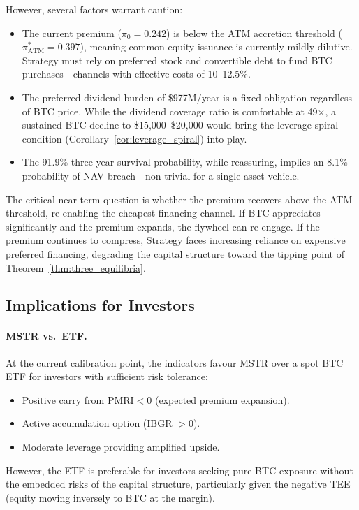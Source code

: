 However, several factors warrant caution:
\begin{itemize}
  \item The current premium ($\pi_0 = 0.242$) is below the ATM accretion
    threshold ($\pi^*_{\mathrm{ATM}} = 0.397$), meaning common equity
    issuance is currently mildly dilutive.  Strategy must rely on
    preferred stock and convertible debt to fund BTC purchases---channels
    with effective costs of 10--12.5\%.
  \item The preferred dividend burden of \$977M/year is a fixed obligation
    regardless of BTC price.  While the dividend coverage ratio is
    comfortable at 49$\times$, a sustained BTC decline to \$15,000--\$20,000
    would bring the leverage spiral condition
    (Corollary~\ref{cor:leverage_spiral}) into play.
  \item The 91.9\% three-year survival probability, while reassuring,
    implies an 8.1\% probability of NAV breach---non-trivial for a
    single-asset vehicle.
\end{itemize}

The critical near-term question is whether the premium recovers above the
ATM threshold, re-enabling the cheapest financing channel.  If BTC
appreciates significantly and the premium expands, the flywheel can
re-engage.  If the premium continues to compress, Strategy faces increasing
reliance on expensive preferred financing, degrading the capital structure
toward the tipping point of Theorem~\ref{thm:three_equilibria}.

\subsection{Implications for Investors}

\paragraph{MSTR vs.\ ETF.}
At the current calibration point, the indicators favour MSTR over a spot
BTC ETF for investors with sufficient risk tolerance:
\begin{itemize}
  \item Positive carry from $\mathrm{PMRI} < 0$ (expected premium
    expansion).
  \item Active accumulation option (IBGR $> 0$).
  \item Moderate leverage providing amplified upside.
\end{itemize}
However, the ETF is preferable for investors seeking pure BTC exposure
without the embedded risks of the capital structure, particularly given
the negative TEE (equity moving inversely to BTC at the margin).

